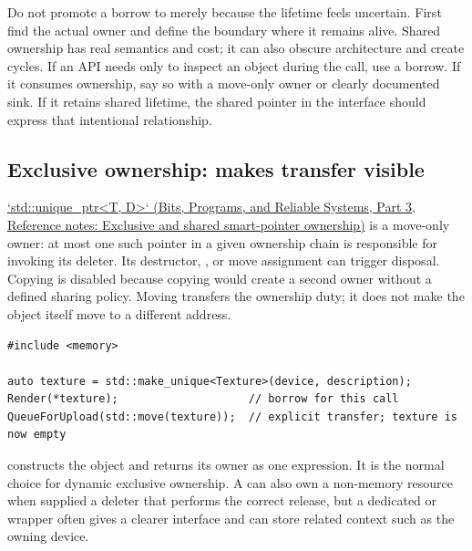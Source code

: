 Do not promote a borrow to  merely because the lifetime feels uncertain. First find the actual owner and define the boundary where it remains alive. Shared ownership has real semantics and cost; it can also obscure architecture and create cycles. If an API needs only to inspect an object during the call, use a borrow. If it consumes ownership, say so with a move-only owner or clearly documented sink. If it retains shared lifetime, the shared pointer in the interface should express that intentional relationship.

\subsection{\texorpdfstring{Exclusive ownership:  makes transfer visible}{Exclusive ownership:  makes transfer visible}}\label{05-engine-i-ch004-exclusive-ownership-unique_ptr-makes-transfer-visible}

\hypertarget{05-engine-i-ch004-exclusive-ownership-unique_ptr-makes-transfer-visible}{}

\href{../01-Bits-Programs-and-Reliable-Systems-P03/main.pdf\#appendix-51602cabe815}{`std::unique\_ptr\textless T, D\textgreater` (Bits, Programs, and Reliable Systems, Part 3, Reference notes: Exclusive and shared smart-pointer ownership)} is a move-only owner: at most one such pointer in a given ownership chain is responsible for invoking its deleter. Its destructor, , or move assignment can trigger disposal. Copying is disabled because copying would create a second owner without a defined sharing policy. Moving transfers the ownership duty; it does not make the object itself move to a different address.

\begin{verbatim}
#include <memory>

auto texture = std::make_unique<Texture>(device, description);
Render(*texture);                    // borrow for this call
QueueForUpload(std::move(texture));  // explicit transfer; texture is now empty
\end{verbatim}

 constructs the object and returns its owner as one expression. It is the normal choice for dynamic exclusive ownership. A  can also own a non-memory resource when supplied a deleter that performs the correct release, but a dedicated  or  wrapper often gives a clearer interface and can store related context such as the owning device.

